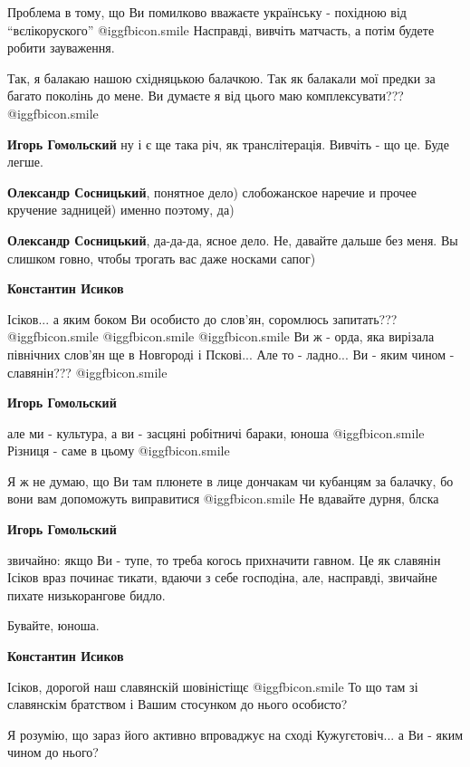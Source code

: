 \begin{itemize}
\begin{itemize}
Проблема в тому, що Ви помилково вважаєте українську - похідною від
\enquote{вєлікоруского}  @igg{fbicon.smile}  Насправді, вивчіть матчасть, а потім будете робити
зауваження.

Так, я балакаю нашою східняцькою балачкою. Так як балакали мої предки за багато
поколінь до мене. Ви думаєте я від цього маю комплексувати???  @igg{fbicon.smile} 


\textbf{Игорь Гомольский} ну і є ще така річ, як транслітерація. Вивчіть - що це. Буде легше.

\textbf{Олександр Сосницький}, понятное дело) слобожанское наречие и прочее кручение задницей) именно поэтому, да)

\textbf{Олександр Сосницький}, да-да-да, ясное дело. Не, давайте дальше без меня. Вы слишком говно, чтобы трогать вас даже носками сапог)

\textbf{Константин Исиков} 

Ісіков... а яким боком Ви особисто до слов'ян, соромлюсь запитать???
@igg{fbicon.smile}   @igg{fbicon.smile}   @igg{fbicon.smile}  Ви ж - орда, яка
вирізала північних слов'ян ще в Новгороді і Пскові... Але то - ладно... Ви -
яким чином - славянін???  @igg{fbicon.smile} 

\textbf{Игорь Гомольский} 

але ми - культура, а ви - засцяні робітничі бараки, юноша  @igg{fbicon.smile}
Різниця - саме в цьому  @igg{fbicon.smile} 

Я ж не думаю, що Ви там плюнете в лице дончакам чи кубанцям за балачку, бо вони
вам допоможуть виправитися  @igg{fbicon.smile} Не вдавайте дурня, блска

\textbf{Игорь Гомольский} 

звичайно: якщо Ви - тупе, то треба когось прихначити гавном. Це як славянін
Ісіков враз починає тикати, вдаючи з себе господіна, але, насправді, звичайне
пихате низькорангове бидло.

Бувайте, юноша.

\textbf{Константин Исиков} 

Ісіков, дорогой наш славянскій шовіністіщє  @igg{fbicon.smile}  То що там зі славянскім братством
і Вашим стосунком до нього особисто?

Я розумію, що зараз його активно впроваджує на сході Кужугєтовіч... а Ви - яким
чином до нього?

\end{itemize} %

\end{itemize} %
